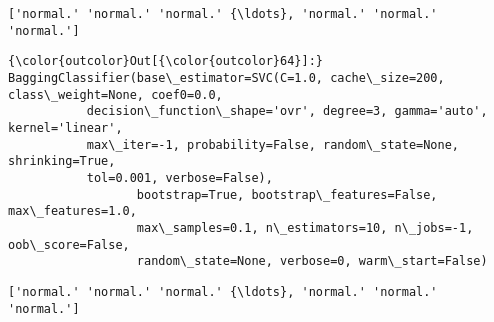 \documentclass[11pt]{article}
\begin{document}
    \begin{Verbatim}[commandchars=\\\{\}]
['normal.' 'normal.' 'normal.' {\ldots}, 'normal.' 'normal.' 'normal.']

    \end{Verbatim}

\begin{Verbatim}[commandchars=\\\{\}]
{\color{outcolor}Out[{\color{outcolor}64}]:} BaggingClassifier(base\_estimator=SVC(C=1.0, cache\_size=200, class\_weight=None, coef0=0.0,
           decision\_function\_shape='ovr', degree=3, gamma='auto', kernel='linear',
           max\_iter=-1, probability=False, random\_state=None, shrinking=True,
           tol=0.001, verbose=False),
                  bootstrap=True, bootstrap\_features=False, max\_features=1.0,
                  max\_samples=0.1, n\_estimators=10, n\_jobs=-1, oob\_score=False,
                  random\_state=None, verbose=0, warm\_start=False)
\end{Verbatim}
            
    \begin{Verbatim}[commandchars=\\\{\}]
['normal.' 'normal.' 'normal.' {\ldots}, 'normal.' 'normal.' 'normal.']

    \end{Verbatim}
\end{document}
